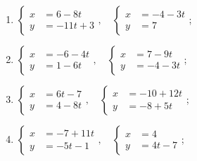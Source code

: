	\vspace{10pt}
	\begin{enumerate}
		\setcounter{enumi}{\value{tasks}}

			\item \( \displaystyle \left\lbrace \begin{aligned}
						x &= 6-8t \\
						y &= -11t+3
					\end{aligned} \right., \quad \left\lbrace \begin{aligned}
						x &= -4-3t \\
						y &= 7
					\end{aligned} \right. \);
			\item \( \displaystyle \left\lbrace \begin{aligned}
						x &= -6-4t \\
						y &= 1-6t
					\end{aligned} \right., \quad \left\lbrace \begin{aligned}
						x &= 7-9t \\
						y &= -4-3t
					\end{aligned} \right. \);
			\item \( \displaystyle \left\lbrace \begin{aligned}
						x &= 6t-7 \\
						y &= 4-8t
					\end{aligned} \right., \quad \left\lbrace \begin{aligned}
						x &= -10+12t \\
						y &= -8+5t
					\end{aligned} \right. \);
			\item \( \displaystyle \left\lbrace \begin{aligned}
						x &= -7+11t \\
						y &= -5t-1
					\end{aligned} \right., \quad \left\lbrace \begin{aligned}
						x &= 4 \\
						y &= 4t-7
					\end{aligned} \right. \);

		\setcounter{tasks}{\value{enumi}}
	\end{enumerate}

